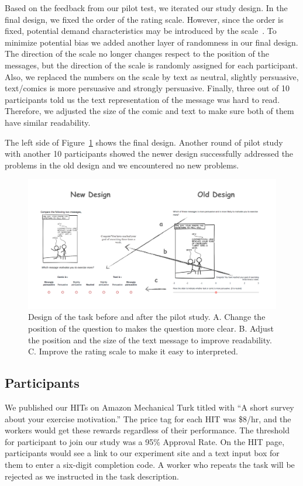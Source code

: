 Based on the feedback from our pilot test, we iterated our study design. In the final design, we fixed the order of the rating scale. However, since the order is fixed, potential demand characteristics may be introduced by the scale~\cite{orne1962social}. To minimize potential bias we added another layer of randomness in our final design. The direction of the scale no longer changes respect to the position of the messages, but the direction of the scale is randomly assigned for each participant. Also, we replaced the numbers on the scale by text as neutral, slightly persuasive, text/comics is more persuasive and strongly persuasive. Finally, three out of 10 participants told us the text representation of the message was hard to read. Therefore, we adjusted the size of the comic and text to make sure both of them have similar readability.

The left side of Figure~\ref{fig:change} shows the final design. Another round of pilot study with another 10 participants showed the newer design successfully addressed the problems in the old design and we encountered no new problems.

\begin{figure}
 \centering
 \includegraphics[width=0.95\columnwidth]{figures/change}
 \caption{Design of the task before and after the pilot study. A. Change the position of the question to makes the question more clear. B. Adjust the position and the size of the text message to improve readability. C. Improve the rating scale to make it easy to interpreted.}
 \label{fig:change}
\end{figure}


\subsection{Participants}
We published our HITs on Amazon Mechanical Turk titled with ``A short survey about your exercise motivation.'' The price tag for each HIT was \$8/hr, and the workers would get these rewards regardless of their performance. The threshold for participant to join our study was a 95\% Approval Rate. On the HIT page, participants would see a link to our experiment site and a text input box for them to enter a six-digit completion code. A worker who repeats the task will be rejected as we instructed in the task description.
